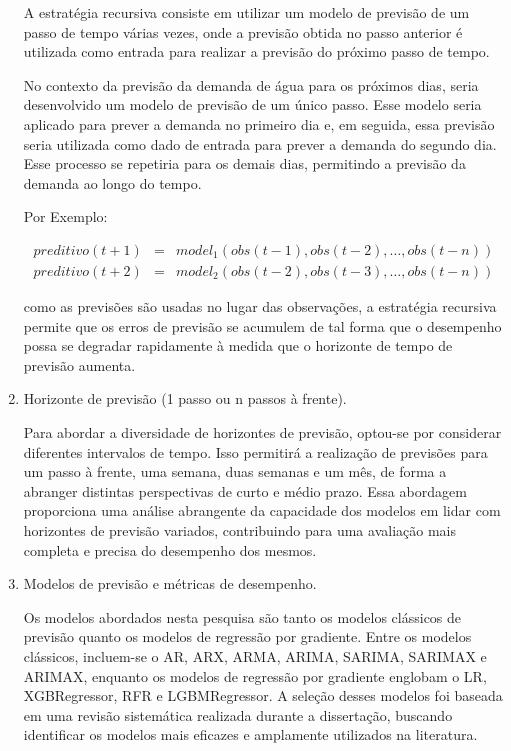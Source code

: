 \begin{enumerate}[start=1, label = {\textbf{Etapa} \arabic*} ]
    	A estratégia recursiva consiste em utilizar um modelo de previsão de um passo de tempo várias vezes, onde a previsão obtida no passo anterior é utilizada como entrada para realizar a previsão do próximo passo de tempo.
    	
    	No contexto da previsão da demanda de água para os próximos dias, seria desenvolvido um modelo de previsão de um único passo. Esse modelo seria aplicado para prever a demanda no primeiro dia e, em seguida, essa previsão seria utilizada como dado de entrada para prever a demanda do segundo dia. Esse processo se repetiria para os demais dias, permitindo a previsão da demanda ao longo do tempo.
    	    		 
    	Por Exemplo:
    	
    	\begin{eqnarray}
    	preditivo(t+1) &=& model_1(obs(t-1), obs(t-2), \ldots, obs(t-n))\\
    	preditivo(t+2) &=& model_2(obs(t-2), obs(t-3), \ldots, obs(t-n))   	
    	\end{eqnarray}
    	
    	 como as previsões são usadas no lugar das observações, a estratégia recursiva permite que os erros de previsão se acumulem de tal forma que o desempenho possa se degradar rapidamente à medida que o horizonte de tempo de previsão aumenta.
    	
    	
    	\item Horizonte de previsão (1 passo ou n passos à frente). \label{etp:6}
    	
    	Para abordar a diversidade de horizontes de previsão, optou-se por considerar diferentes intervalos de tempo. Isso permitirá a realização de previsões para um passo à frente, uma semana, duas semanas e um mês, de forma a abranger distintas perspectivas de curto e médio prazo. Essa abordagem proporciona uma análise abrangente da capacidade dos modelos em lidar com horizontes de previsão variados, contribuindo para uma avaliação mais completa e precisa do desempenho dos mesmos.
    	
    	
    	\item Modelos de previsão e métricas de desempenho. \label{etp:7}
    	
    	Os modelos abordados nesta pesquisa são tanto os modelos clássicos de previsão quanto os modelos de regressão por gradiente. Entre os modelos clássicos, incluem-se o AR, ARX, ARMA, ARIMA, SARIMA, SARIMAX e ARIMAX, enquanto os modelos de regressão por gradiente englobam o LR, XGBRegressor, RFR e LGBMRegressor. A seleção desses modelos foi baseada em uma revisão sistemática realizada durante a dissertação, buscando identificar os modelos mais eficazes e amplamente utilizados na literatura.
    	

\end{enumerate}
